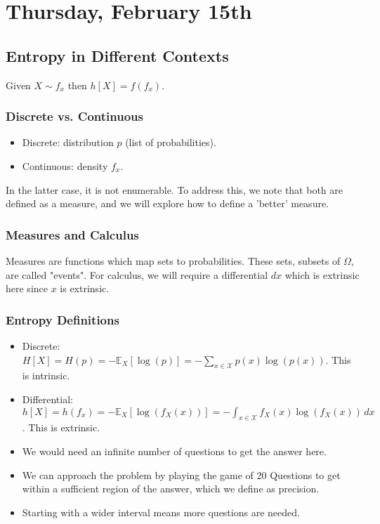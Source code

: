 \section{Thursday, February 15th}
\subsection{Entropy in Different Contexts}

Given \( X \sim f_x \) then \( h[X] = f(f_x) \).

\subsubsection{Discrete vs. Continuous}

\begin{itemize}
    \item Discrete: distribution \( p \) (list of probabilities).
    \item Continuous: density \( f_x \).
\end{itemize}

In the latter case, it is not enumerable. To address this, we note that both are defined as a measure, and we will explore how to define a 'better' measure.

\subsubsection{Measures and Calculus}

Measures are functions which map sets to probabilities. These sets, subsets of \( \Omega \), are called "events". For calculus, we will require a differential \( dx \) which is extrinsic here since \( x \) is extrinsic.

\subsubsection{Entropy Definitions}

\begin{itemize}
    \item Discrete: \( H[X] = H(p) = -\mathbb{E}_X[\log(p)] = -\sum_{x \in \mathcal{X}} p(x) \log(p(x)) \). This is intrinsic.
    \item Differential: \( h[X] = h(f_x) = -\mathbb{E}_X[\log(f_X(x))] = -\int_{x \in \mathcal{X}} f_X(x) \log(f_X(x)) \, dx \). This is extrinsic.
\end{itemize}

\begin{itemize}
    \item We would need an infinite number of questions to get the answer here.
    \item We can approach the problem by playing the game of 20 Questions to get within a sufficient region of the answer, which we define as precision.
    \item Starting with a wider interval means more questions are needed.
\end{itemize}

